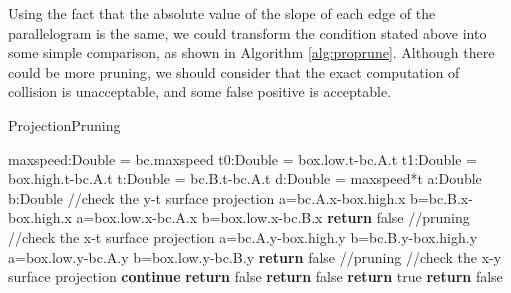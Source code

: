 \documentclass[sigplan]{acmart}
\begin{document}
Using the fact that the absolute value of the slope of each edge of the parallelogram is the same, we could transform the condition stated above into some simple comparison, as shown in Algorithm \ref{alg:proprune}. Although there could be more pruning, we should consider that the exact computation of collision is unacceptable, and some false positive is acceptable.
\begin{algorithm}
\caption{ProjectionPruning} \label{alg:proprune}
\begin{algorithmic}[1]
    \State maxspeed:Double = bc.maxspeed
    \State t0:Double = box.low.t-bc.A.t
    \State t1:Double = box.high.t-bc.A.t
    \State t:Double = bc.B.t-bc.A.t
    \State d:Double = maxspeed*t
    \State a:Double
    \State b:Double
    \State //check the y-t surface projection
        \State a=bc.A.x-box.high.x
        \State b=bc.B.x-box.high.x
    \Else
        \State a=box.low.x-bc.A.x
        \State b=box.low.x-bc.B.x
    \EndIf
        \State \textbf{return} false //pruning
    \EndIf
    \State //check the x-t surface projection
        \State a=bc.A.y-box.high.y
        \State b=bc.B.y-box.high.y
    \Else
        \State a=box.low.y-bc.A.y
        \State b=box.low.y-bc.B.y
    \EndIf
        \State \textbf{return} false //pruning
    \EndIf
    \State //check the x-y surface projection
            \State \textbf{continue}
    \EndIf
            \State \textbf{return} false
        \EndIf
    \Else
            \State \textbf{return} false
        \EndIf
    \EndIf
    \State \textbf{return} true
\EndFunction
{}
        \State \textbf{return} false
    \EndIf
\EndFunction
\end{algorithmic}
\end{algorithm}
\end{document}
